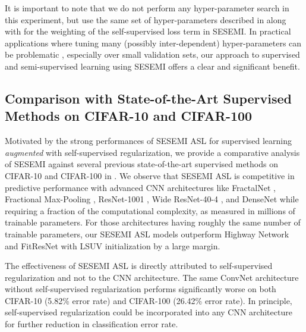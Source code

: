 \documentclass{article}
\begin{document}
It is important to note that we do not perform any hyper-parameter search in this experiment, but use the same set of hyper-parameters described in  along with  for the weighting of the self-supervised loss term in SESEMI. In practical applications where tuning many (possibly inter-dependent) hyper-parameters can be problematic \cite{ssl-eval}, especially over small validation sets, our approach to supervised and semi-supervised learning using SESEMI offers a clear and significant benefit.

\subsection{Comparison with State-of-the-Art Supervised Methods on CIFAR-10 and CIFAR-100}
Motivated by the strong performances of SESEMI ASL for supervised learning \emph{augmented} with self-supervised regularization, we provide a comparative analysis of SESEMI against several previous state-of-the-art supervised methods on CIFAR-10 and CIFAR-100 in . We observe that SESEMI ASL is competitive in predictive performance with advanced CNN architectures like FractalNet \cite{fractalnet}, Fractional Max-Pooling \cite{fmp}, ResNet-1001 \cite{resnet1001}, Wide ResNet-40-4 \cite{wrn}, and DenseNet \cite{densenet} while requiring a fraction of the computational complexity, as measured in millions of trainable parameters. For those architectures having roughly the same number of trainable parameters, our SESEMI ASL models outperform Highway Network \cite{highway} and FitResNet with LSUV initialization \cite{fitresnet} by a large margin.

The effectiveness of SESEMI ASL is directly attributed to self-supervised regularization and not to the CNN architecture. The same ConvNet architecture without self-supervised regularization performs significantly worse on both CIFAR-10 (5.82\% error rate) and CIFAR-100 (26.42\% error rate). In principle, self-supervised regularization could be incorporated into any CNN architecture for further reduction in classification error rate.
\end{document}
